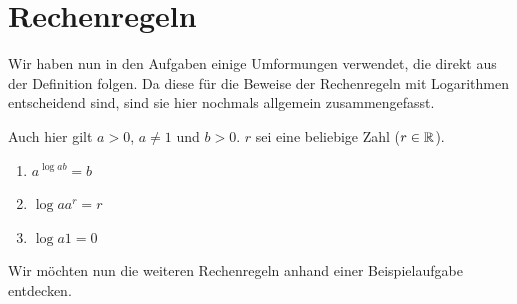 \documentclass[11pt,oneside]{article}
\begin{document}
\section{Rechenregeln}
	Wir haben nun in den Aufgaben einige Umformungen verwendet, die direkt aus der Definition folgen. Da diese für die Beweise der Rechenregeln mit Logarithmen entscheidend sind, sind sie hier nochmals allgemein zusammengefasst.
	\begin{satz}
		Auch hier gilt $a>0$, $a\neq1$ und $b>0$. $r$ sei eine beliebige Zahl ($r\in\mathbb{R}$).
		\begin{enumerate}
			\item $a^{\log{a}{b}}=b$
			\item $\log{a}{a^r}=r$
			\item $\log{a}{1}=0$
		\end{enumerate}
	\end{satz}
	Wir möchten nun die weiteren Rechenregeln anhand einer Beispielaufgabe entdecken.
\end{document}
